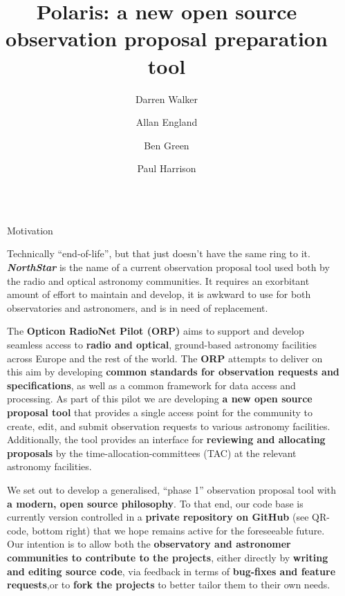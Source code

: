 \documentclass[final]{beamer}
\title{Polaris: a new open source observation proposal preparation tool}
\author{Darren Walker \and Allan England \and Ben Green \and Paul Harrison}
\institute[shortinst]{JCBA, The University of Manchester, UK}
\newlength{\sepwidth}
\newlength{\colwidth}
\newcommand{\separatorcolumn}{\begin{column}{\sepwidth}\end{column}}
\begin{document}
    \begin{frame}[t]
        \begin{columns}[t]
            \separatorcolumn

            \begin{column}{\colwidth}

                \begin{block}{Motivation}

                    Technically ``end-of-life'', but that just doesn't have the same ring to it.
                    \textbf{\emph{NorthStar}} is the name of a current observation proposal tool used both by the radio
                    and optical astronomy communities.
                    It requires an exorbitant amount of effort to maintain and develop, it is awkward to use for both
                    observatories and astronomers, and is in need of replacement.

                    The \textbf{Opticon RadioNet Pilot (ORP)} aims to support and develop seamless access to
                    \textbf{radio and optical}, ground-based astronomy facilities across Europe and the rest of the
                    world.
                    The \textbf{ORP} attempts to deliver on this aim by developing \textbf{common standards for observation
                    requests and specifications}, as well as a common framework for data access and processing.
                    As part of this pilot we are developing \textbf{a new open source proposal tool} that provides a
                    single access point for the community to create, edit, and submit observation requests to various
                    astronomy facilities.
                    Additionally, the tool provides an interface for \textbf{reviewing and allocating proposals} by the
                    time-allocation-committees (TAC) at the relevant astronomy facilities.

                    We set out to develop a generalised, ``phase 1'' observation proposal tool with
                    \textbf{a modern, open source philosophy}.
                    To that end, our code base is currently version controlled in a
                    \textbf{private repository on GitHub} (see QR-code, bottom right) that we hope remains active for
                    the foreseeable future.
                    Our intention is to allow both the
                    \textbf{observatory and astronomer communities to contribute to the projects},
                    either directly by \textbf{writing and editing source code}, via feedback in terms of
                    \textbf{bug-fixes and feature requests},or to \textbf{fork the projects} to better tailor them to
                    their own needs.


\end{block}
\end{column}
\end{columns}
\end{frame}
\end{document}
